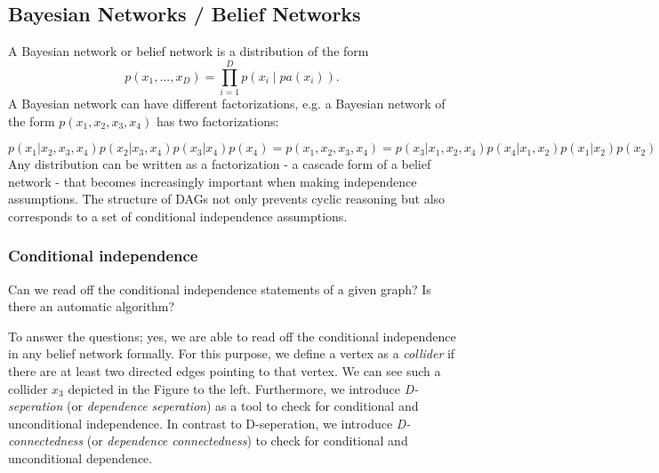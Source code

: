 \subsection{Bayesian Networks / Belief Networks}
\begin{figure}[H]
\centering{}
\end{figure}
A Bayesian network or belief network is a distribution of the form %
\begin{equation}
p( x_1 , \ldots , x_D ) = \prod_{i=1}^{D} p\left( x_i \middle| pa( x_i ) \right).
\label{eq:bayesian_network}
\end{equation}
A Bayesian network can have different factorizations, e.g. a Bayesian network of the form \ensuremath{p( x_1 , x_2 , x_3 , x_4 )} has two factorizations: %
\begin{figure}[H]
\centering{}
\label{fig:BN_factorizations}
\end{figure}
\begin{equation*}
p(x_1|x_2,x_3,x_4) p(x_2|x_3,x_4) p(x_3|x_4) p(x_4) = p(x_1,x_2,x_3,x_4) = p(x_3|x_1,x_2,x_4) p(x_4|x_1,x_2) p(x_1|x_2) p(x_2)
\end{equation*}
Any distribution can be written as a factorization - a cascade form of a belief network - that becomes increasingly important when making independence assumptions. %
The structure of DAGs not only prevents cyclic reasoning but also corresponds to a set of conditional independence assumptions. %
\subsubsection{Conditional independence}%
Can we read off the conditional independence statements of a given graph? Is there an automatic algorithm? %
\begin{minipage}[t]{1\textwidth}
	\begin{minipage}[t]{.18\textwidth}
		\begin{figure}[H]
		\end{figure}
	\end{minipage}
	\hfill%
	\begin{minipage}[t]{.78\textwidth}
		To answer the questions; yes, we are able to read off the conditional independence in any belief network formally. %
		For this purpose, we define a vertex as a \emph{collider} if there are at least two directed edges pointing to that vertex. %
		We can see such a collider \ensuremath{x_3} depicted in the Figure to the left. %
		Furthermore, we introduce \emph{D-seperation} (or \emph{dependence seperation}) as a tool to check for conditional and unconditional independence. %
		In contrast to D-seperation, we introduce \emph{D-connectedness} (or \emph{dependence connectedness}) to check for conditional and unconditional dependence. %
	\end{minipage}
\end{minipage}
